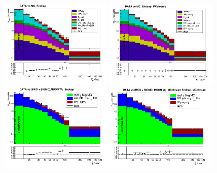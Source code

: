 \begin{figure}[htb]
  \begin{center}
   \includegraphics[width=0.48\textwidth]{../figs/figs_v11/MUON_WGamma/PrepareYields/c_TotalDATAvsMC_Endcap__phoEt.png}
   \includegraphics[width=0.48\textwidth]{../figs/figs_v11/MUON_WGamma/PrepareYields/c_TotalDATAvsMC_Endcap__phoEt_MCclosure.png}\\
   \includegraphics[width=0.48\textwidth]{../figs/figs_v11/MUON_WGamma/PrepareYields/c_DATAvsBkgPlusSigMCc_MUON_WGamma_TEMPL_CHISO_UNblind__Endcap__phoEt.png}\includegraphics[width=0.48\textwidth]{../figs/figs_v11/MUON_WGamma/PrepareYields/c_DATAvsBkgPlusSigMCc_MUON_WGamma_TEMPL_CHISO_UNblind_MCclosure__Endcap__phoEt_MCclosure.png}\\

\end{center}
\end{figure}
